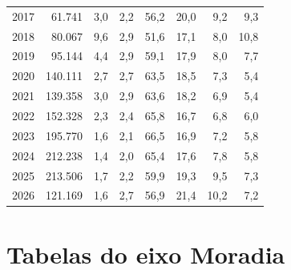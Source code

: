 \begin{apendicesenv}
\begin{landscape}
{\begin{longtable}{@{}rrrrrrrr@{}}
2017 & 61.741 & 3,0 & 2,2 & 56,2 & 20,0 & 9,2 & 9,3 \\
2018 & 80.067 & 9,6 & 2,9 & 51,6 & 17,1 & 8,0 & 10,8 \\
2019 & 95.144 & 4,4 & 2,9 & 59,1 & 17,9 & 8,0 & 7,7 \\
2020 & 140.111 & 2,7 & 2,7 & 63,5 & 18,5 & 7,3 & 5,4 \\
2021 & 139.358 & 3,0 & 2,9 & 63,6 & 18,2 & 6,9 & 5,4 \\
2022 & 152.328 & 2,3 & 2,4 & 65,8 & 16,7 & 6,8 & 6,0 \\
2023 & 195.770 & 1,6 & 2,1 & 66,5 & 16,9 & 7,2 & 5,8 \\
2024 & 212.238 & 1,4 & 2,0 & 65,4 & 17,6 & 7,8 & 5,8 \\
2025 & 213.506 & 1,7 & 2,2 & 59,9 & 19,3 & 9,5 & 7,3 \\
2026 & 121.169 & 1,6 & 2,7 & 56,9 & 21,4 & 10,2 & 7,2 \\
\end{longtable}}
\vspace{-6pt}
\end{landscape}


\chapter{Tabelas do eixo Moradia}\label{ap:eixo-7}


\end{apendicesenv}
